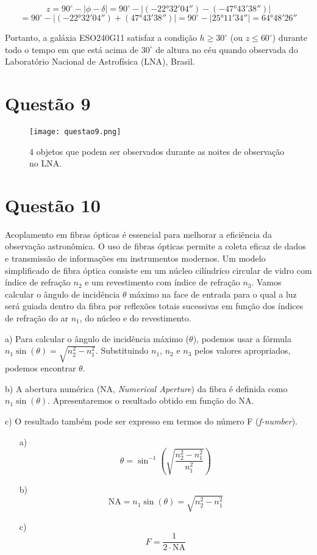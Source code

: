 \documentclass[a4paper, 12pt]{article}
\begin{document}
\[
z = 90^\circ - \left| \phi - \delta \right| 
= 90^\circ - \left| (-22°32'04'') - (-47°43'38'') \right| 
\]
\[
= 90^\circ - \left| (-22°32'04'') + (47°43'38'') \right| 
= 90^\circ - \left| 25°11'34'' \right| 
= 64°48'26''
\]

Portanto, a galáxia ESO240G11 satisfaz a condição \(h \geq 30^\circ\) (ou \(z \leq 60^\circ\)) durante todo o tempo em que está acima de \(30^\circ\) de altura no céu quando observada do Laboratório Nacional de Astrofísica (LNA), Brasil.


\section*{Questão 9}
\begin{figure}[h]
    \centering
    \texttt{[image: questao9.png]}
    \caption{4 objetos que podem ser observados durante as noites de observação no LNA.} %
    \label{fig:questao9}
\end{figure}


\section*{Questão 10}
Acoplamento em fibras ópticas é essencial para melhorar a eficiência da observação astronômica. O uso de fibras ópticas permite a coleta eficaz de dados e transmissão de informações em instrumentos modernos. Um modelo simplificado de fibra óptica consiste em um núcleo cilíndrico circular de vidro com índice de refração \(n_2\) e um revestimento com índice de refração \(n_3\). Vamos calcular o ângulo de incidência \(\theta\) máximo na face de entrada para o qual a luz será guiada dentro da fibra por reflexões totais sucessivas em função dos índices de refração do ar \(n_1\), do núcleo e do revestimento.

a) Para calcular o ângulo de incidência máximo (\(\theta\)), podemos usar a fórmula \(n_1 \sin(\theta) = \sqrt{n_2^2 - n_1^2}\). Substituindo \(n_1\), \(n_2\) e \(n_3\) pelos valores apropriados, podemos encontrar \(\theta\).

b) A abertura numérica (NA, \textit{Numerical Aperture}) da fibra é definida como \(n_1 \sin(\theta)\). Apresentaremos o resultado obtido em função do NA.

c) O resultado também pode ser expresso em termos do número F (\textit{f-number}).

\begin{enumerate}
    \item[a)]
    \[
    \theta = \sin^{-1}\left(\sqrt{\frac{n_2^2 - n_1^2}{n_1^2}}\right)
    \]
    
    \item[b)]
    \[
    \text{NA} = n_1 \sin(\theta) = \sqrt{n_2^2 - n_1^2}
    \]
    
    \item[c)]
    \[
    F = \frac{1}{2 \cdot \text{NA}}
    \]
\end{enumerate}
\end{document}
